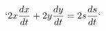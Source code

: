 \documentclass[preview]{standalone}
\begin{document}
\begin{align*}
`2x \frac{dx}{dt} + 2y \frac{dy}{dt} = 2s \frac{ds}{dt}`
\end{align*}
\end{document}
